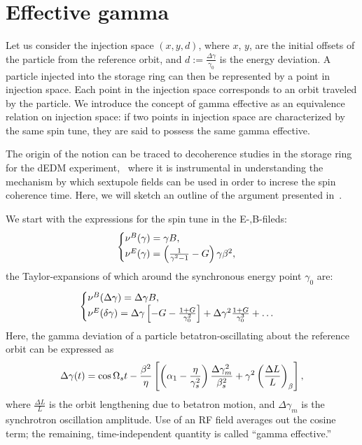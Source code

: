 \documentclass{article}
\begin{document}
\section{Effective gamma}
Let us consider the injection space $(x,y,d)$, where $x$, $y$, are the initial offsets of the particle from the reference orbit, and $d := \frac{\Delta\gamma}{\gamma_0}$ is the energy deviation. A particle injected into the storage ring can then be represented by a point in injection space. Each point in the injection space corresponds to an orbit traveled by the particle. We introduce the concept of gamma effective as an equivalence relation on injection space: if two points in injection space are characterized by the same spin tune, they are said to possess the same gamma effective. 

The origin of the notion can be traced to decoherence studies in the storage ring for the dEDM experiment,~\cite{Senichev:StorageRingMethod} where it is instrumental in understanding the mechanism by which sextupole fields can be used in order to increse the spin coherence time. Here, we will sketch an outline of the argument presented in~\cite{SenichevStorageRingMethod}.

We start with the expressions for the spin tune in the E-,B-fileds:
\begin{equation}\label{eq:spin_tune}
  \begin{cases}
    \nu^B(\gamma) = \gamma B,\\
    \nu^E(\gamma) = \bkt{\frac{1}{\gamma^2-1}-G}\gamma\beta^2,
  \end{cases}
\end{equation}
the Taylor-expansions of which around the synchronous energy point $\gamma_0$ are:
\begin{equation}
  \begin{cases}
    \nu^B(\Delta\gamma) = \Delta\gamma B,\\
    \nu^E(\delta\gamma) = \Delta\gamma\bkt*{-G - \frac{1+G}{\gamma_0^2}} + \Delta\gamma^2\frac{1+G}{\gamma_0^3} + \dots
  \end{cases}
\end{equation}
Here, the gamma deviation of a particle betatron-oscillating about the reference orbit can be expressed as
\begin{equation}\label{eq:delta_gamma}
  \Delta\gamma(t) = \cos\Omega_s t - \frac{\beta^2}{\eta}\bkt*{\bkt{\alpha_1 - \frac{\eta}{\gamma_s^2}}\frac{\Delta\gamma_m^2}{\beta_s^2} + \gamma^2\bkt{\frac{\Delta L}{L}}_\beta},
\end{equation}
where $\frac{\Delta L}{L}$ is the orbit lengthening due to betatron motion, and $\Delta\gamma_m$ is the synchrotron oscillation amplitude. Use of an RF field averages out the cosine term; the remaining, time-independent quantity is called ``gamma effective.''
\end{document}
